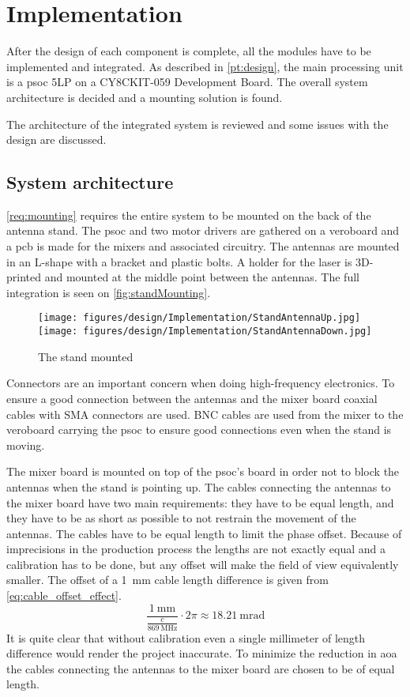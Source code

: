 \chapter{Implementation} \label{ch:implementation}
After the design of each component is complete, all the modules have to be implemented and integrated. As described in \autoref{pt:design}, the main processing unit is a \gls{psoc} 5LP on a CY8CKIT-059 Development Board. The overall system architecture is decided and a mounting solution is found.

The architecture of the integrated system is reviewed and some issues with the design are discussed.

\section{System architecture}
\autoref{req:mounting} requires the entire system to be mounted on the back of the antenna stand. The \gls{psoc} and two motor drivers are gathered on a veroboard and a \gls{pcb} is made for the mixers and associated circuitry. The antennas are mounted in an L-shape with a bracket and plastic bolts. A holder for the laser is 3D-printed and mounted at the middle point between the antennas.
The full integration is seen on \autoref{fig:standMounting}.
\begin{figure}[h]
	\centering
	\texttt{[image: figures/design/Implementation/StandAntennaUp.jpg]}
	\texttt{[image: figures/design/Implementation/StandAntennaDown.jpg]}
	\caption{The stand mounted}\label{fig:standMounting}
\end{figure}

Connectors are an important concern when doing high-frequency electronics. To ensure a good connection between the antennas and the mixer board coaxial cables with SMA connectors are used.  BNC cables are used from the mixer to the veroboard carrying the \gls{psoc} to ensure good connections even when the stand is moving.

The mixer board is mounted on top of the \gls{psoc}'s board in order not to block the antennas when the stand is pointing up. The cables connecting the antennas to the mixer board have two main requirements: they have to be equal length, and they have to be as short as possible to not restrain the movement of the antennas. 
The cables have to be equal length to limit the phase offset. Because of imprecisions in the production process the lengths are not exactly equal and a calibration has to be done, but any offset will make the field of view equivalently smaller. The offset of a \SI{1}{\milli\meter} cable length difference is given from \autoref{eq:cable_offset_effect}.
\begin{equation} \label{eq:cable_offset_effect}
	\frac{\SI{1}{\milli\meter}}{\frac{c}{\SI{869}{\mega\hertz}}} \cdot 2\pi \approx \SI{18,21}{\milli\radian}
\end{equation}
It is quite clear that without calibration even a single millimeter of length difference would render the project inaccurate. To minimize the reduction in \gls{aoa} the cables connecting the antennas to the mixer board are chosen to be of equal length.

